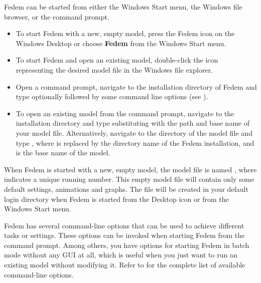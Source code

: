 
Fedem can be started from either the Windows Start menu,
the Windows file browser, or the command prompt.

\begin{itemize}
\item To start Fedem with a new, empty model, press the Fedem icon on the
  Windows Desktop or choose \textbf{Fedem} from the Windows Start menu.
\item To start Fedem and open an existing model, double-click the icon
  representing the desired model file in the Windows file explorer.
\item Open a command prompt, navigate to the installation directory of Fedem
  and type  optionally followed by some command line options
  (see ).
\item To open an existing model from the command prompt,
  navigate to the installation directory and type
   substituting
   with the path and base name of your model file.
  Alternatively, navigate to the directory of the model file and type
  , where
   is replaced by
  the directory name of the Fedem installation, and
   is the base name of the model.
\end{itemize}

When Fedem is started with a new, empty model, the model file is named
\Untitled, where \File{\Variable{\#}} indicates a unique running number. This
empty model file will contain only some default settings, animations and graphs.
The file will be created in your default login directory when Fedem is started
from the Desktop icon or from the Windows Start menu.



Fedem has several command-line options that can be used to achieve
different tasks or settings. These options can be invoked when starting
Fedem from the command prompt. Among others, you have options for
starting Fedem in batch mode without any GUI at all, which is useful when
you just want to run an existing model without modifying it.
Refer to 
for the complete list of available command-line options.

